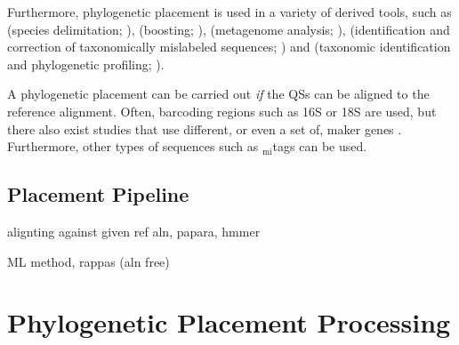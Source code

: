 Furthermore, phylogenetic placement is used in a variety of derived tools,
such as  (species delimitation; \cite{Zhang2013,Kapli2017}),
 (boosting; \cite{Mirarab2012}),
 (metagenome analysis; \cite{Darling2014}),
 (identification and correction of taxonomically mislabeled sequences; \cite{Kozlov2016})
and  (taxonomic identification and phylogenetic profiling; \cite{Nguyen2014}).

A phylogenetic placement can be carried out {\em if} the \acp{QS} can be aligned to the reference alignment.
Often, barcoding regions such as 16S or 18S are used,
but there also exist studies that use different, or even a set of, maker genes \citep{Sunagawa2013a}.
Furthermore, other types of sequences such as $_{\text{mi}}$tags %
\citep{Logares2014} can be used.


\subsection{Placement Pipeline}
\label{ch:Foundations:sec:PhylogeneticPlacement:sub:PlacementPipeline}


alignting against given ref aln, papara, hmmer

ML method, rappas (aln free)



\section{Phylogenetic Placement Processing}
\label{ch:Foundations:sec:PhylogeneticPlacementProcessing}

